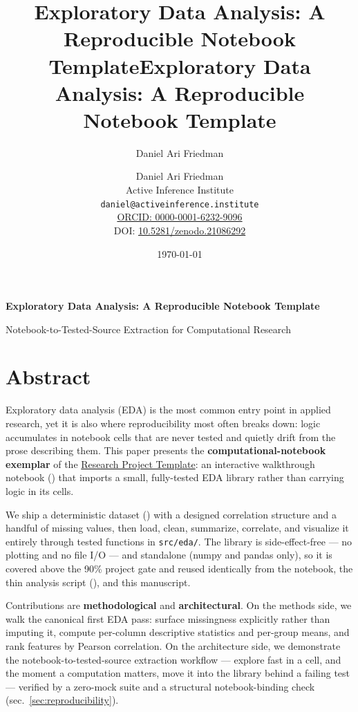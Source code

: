 \documentclass[
  english,
]{article}
\title{Exploratory Data Analysis: A Reproducible Notebook Template}
\author{Daniel Ari Friedman}
\date{}
\title{Exploratory Data Analysis: A Reproducible Notebook Template}
\author{Daniel Ari Friedman\\\footnotesize{Active Inference Institute}\\\footnotesize{\texttt{daniel@activeinference.institute}}\\\footnotesize{\href{https://orcid.org/0000-0001-6232-9096}{ORCID: 0000-0001-6232-9096}} \\ \footnotesize{DOI: \href{https://doi.org/10.5281/zenodo.21086292}{10.5281/zenodo.21086292}}}
\date{\today}
\begin{document}
\begin{titlepage}
\centering
\vspace*{2cm}
{\LARGE\bfseries Exploratory Data Analysis: A Reproducible Notebook Template\par}
\vspace{0.75em}
{\large Notebook-to-Tested-Source Extraction for Computational Research\par}
\vfill
\makeatletter
{\@author\par}
\vspace{1em}
{\@date\par}
\makeatother
\vfill
\end{titlepage}
\thispagestyle{empty}
\tableofcontents
\newpage

\section{Abstract}\label{sec:abstract}

Exploratory data analysis (EDA) is the most common entry point in
applied research, yet it is also where reproducibility most often breaks
down: logic accumulates in notebook cells that are never tested and
quietly drift from the prose describing them. This paper presents the
\textbf{computational-notebook exemplar} of the
\href{https://github.com/docxology/template}{Research Project Template}:
an interactive walkthrough notebook
()
that imports a small, fully-tested EDA library rather than carrying
logic in its cells.

We ship a deterministic dataset () with a
designed correlation structure and a handful of missing values, then
load, clean, summarize, correlate, and visualize it entirely through
tested functions in \texttt{src/eda/}. The library is side-effect-free
--- no plotting and no file I/O --- and standalone (numpy and pandas
only), so it is covered above the 90\% project gate and reused
identically from the notebook, the thin analysis script
(), and this manuscript.

Contributions are \textbf{methodological} and \textbf{architectural}. On
the methods side, we walk the canonical first EDA pass: surface
missingness explicitly rather than imputing it, compute per-column
descriptive statistics and per-group means, and rank features by Pearson
correlation. On the architecture side, we demonstrate the
notebook-to-tested-source extraction workflow --- explore fast in a
cell, and the moment a computation matters, move it into the library
behind a failing test --- verified by a zero-mock suite and a structural
notebook-binding check (sec.~\ref{sec:reproducibility}).
\end{document}
